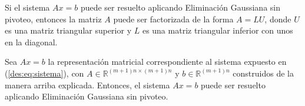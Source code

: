       \begin{prop} \label{prop:EG sin pivoteo implica LU}
        Si el sistema $Ax=b$ puede ser resuelto aplicando Eliminación Gaussiana sin pivoteo, entonces la matriz $A$ puede ser factorizada de la forma $A=LU$, donde $U$ es una matriz triangular superior y $L$ es una matriz triangular inferior con unos en la diagonal.\cite[p.~403]{burden}
      \end{prop}

      \begin{prop} \label{prop:Puede aplicarse EG}
        Sea $Ax=b$ la representación matricial correspondiente al sistema expuesto en (\ref{des:eq:sistema}), con $A \in \mathbb{R}^{(m+1)n \times (m+1)n}$ y $b \in \mathbb{R}^{(m+1)n}$ construidos de la manera arriba explicada. Entonces, el sistema $Ax=b$ puede ser resuelto aplicando Eliminación Gaussiana sin pivoteo.
      \end{prop}

